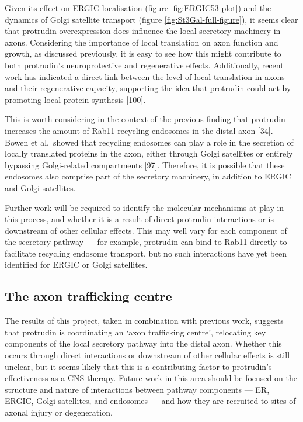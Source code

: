 \documentclass[
  12pt,
  a4paper,
]{book}
\begin{document}
Given its effect on ERGIC localisation (figure \ref{fig:ERGIC53-plot}) and the dynamics of Golgi satellite transport (figure \ref{fig:St3Gal-full-figure}), it seems clear that protrudin overexpression does influence the local secretory machinery in axons. Considering the importance of local translation on axon function and growth, as discussed previously, it is easy to see how this might contribute to both protrudin's neuroprotective and regenerative effects. Additionally, recent work has indicated a direct link between the level of local translation in axons and their regenerative capacity, supporting the idea that protrudin could act by promoting local protein synthesis {[}100{]}.

This is worth considering in the context of the previous finding that protrudin increases the amount of Rab11 recycling endosomes in the distal axon {[}34{]}. Bowen et al.~showed that recycling endosomes can play a role in the secretion of locally translated proteins in the axon, either through Golgi satellites or entirely bypassing Golgi-related compartments {[}97{]}. Therefore, it is possible that these endosomes also comprise part of the secretory machinery, in addition to ERGIC and Golgi satellites.

Further work will be required to identify the molecular mechanisms at play in this process, and whether it is a result of direct protrudin interactions or is downstream of other cellular effects. This may well vary for each component of the secretory pathway --- for example, protrudin can bind to Rab11 directly to facilitate recycling endosome transport, but no such interactions have yet been identified for ERGIC or Golgi satellites.

\hypertarget{the-axon-trafficking-centre}{%
\subsection{The axon trafficking centre}\label{the-axon-trafficking-centre}}

The results of this project, taken in combination with previous work, suggests that protrudin is coordinating an `axon trafficking centre', relocating key components of the local secretory pathway into the distal axon. Whether this occurs through direct interactions or downstream of other cellular effects is still unclear, but it seems likely that this is a contributing factor to protrudin's effectiveness as a CNS therapy. Future work in this area should be focused on the structure and nature of interactions between pathway components --- ER, ERGIC, Golgi satellites, and endosomes --- and how they are recruited to sites of axonal injury or degeneration.
\end{document}
